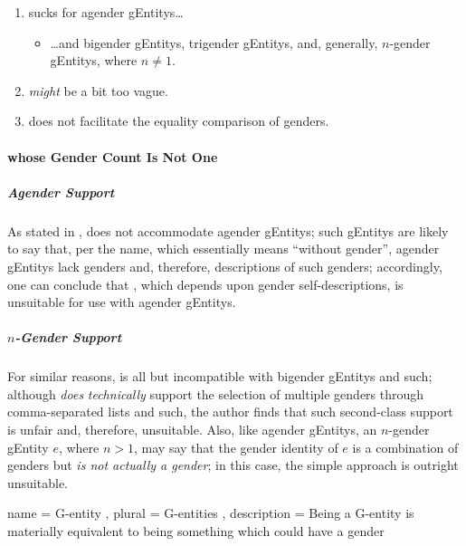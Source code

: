 \documentclass{article}
\begin{document}
\begin{enumerate}
  \item {} sucks for agender \glspl{gEntity}\ldots{}\label{enum:gender1agender}
  \begin{itemize}
    \item \ldots and bigender \glspl{gEntity}, trigender \glspl{gEntity}, and, generally, \(n\)-gender \glspl{gEntity}, where \(n \neq 1\).
  \end{itemize}
  \item {} \emph{might} be a bit too vague.
  \item {} does not facilitate the equality comparison of genders.
\end{enumerate}

\paragraph{ whose Gender Count Is Not One}
\subparagraph{Agender Support}
As stated in ,  does not accommodate agender \glspl{gEntity}; such \glspl{gEntity} are likely to say that,\cite{healthline-agender}\cite{lgbtqia-wiki-agender} per the name, which essentially means ``without gender'',\cite{lgbtqia-wiki-agender} agender \glspl{gEntity} lack genders and, therefore, descriptions of such genders; accordingly, one can conclude that , which depends upon gender self-descriptions, is unsuitable for use with agender \glspl{gEntity}.

\subparagraph{\(n\)-Gender Support}
For similar reasons,  is all but incompatible with bigender \glspl{gEntity} and such; although  \emph{does} \emph{technically} support the selection of multiple genders through comma-separated lists and such, the author finds that such second-class support is unfair and, therefore, unsuitable.  Also, like agender \glspl{gEntity}, an \(n\)-gender \gls{gEntity} \(e\), where \(n > 1\), may say that the gender identity of \(e\) is a combination of genders but \emph{is not actually a gender};\cite{citationNeeded} in this case, the simple  approach is outright unsuitable.

\printbibliography{}

  { name = {G-entity}
  , plural = {G-entities}
  , description = Being a G-entity is materially equivalent to being something which could have a gender
  }

\printglossary{}
\end{document}
